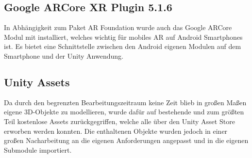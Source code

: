 \subsection{Google ARCore XR Plugin 5.1.6}
In Abhängigkeit zum Paket AR Foundation wurde auch das Google ARCore Modul mit installiert, welches wichtig für mobiles \ac{AR} auf Android Smartphones ist. Es bietet eine Schnittstelle zwischen den Android eigenen Modulen auf dem Smartphone und der Unity Anwendung.

\subsection{Unity Assets}
Da durch den begrenzten Bearbeitungszeitraum keine Zeit blieb in großen Maßen eigene \ac{3D}-Objekte zu modellieren, wurde dafür auf bestehende und zum größten Teil kostenlose Assets zurückgegriffen, welche alle über den Unity Asset Store erworben werden konnten. Die enthaltenen Objekte wurden jedoch in einer großen Nacharbeitung an die eigenen Anforderungen angepasst und in die eigenen Submodule importiert.
